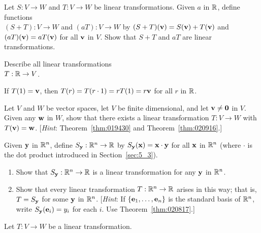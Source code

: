 \begin{multicols}{2}
\begin{ex}
Let $S : V \to W$ and $T : V \to W$ be linear transformations. Given $a$ in $\mathbb{R}$, define functions \\ $(S + T) : V \to W$ and $(aT) : V \to W$ by $(S + T)(\textbf{v}) = S(\textbf{v}) + T(\textbf{v})$ and $(aT)(\textbf{v}) = aT(\textbf{v})$ for all $\textbf{v}$ in $V$. Show that $S + T$ and $aT$ are linear transformations.
\end{ex}

\begin{ex}
Describe all linear transformations \\ $T : \mathbb{R} \to V$.

\begin{sol}
If $T(1) = \textbf{v}$, then $T(r) = T(r \cdot 1) = rT(1) = r\textbf{v}$ for all $r$ in $\mathbb{R}$.
\end{sol}
\end{ex}

\begin{ex}
Let $V$ and $W$ be vector spaces, let $V$ be finite dimensional, and let $\textbf{v} \neq \textbf{0}$ in $V$. Given any $\textbf{w}$ in $W$, show that there exists a linear transformation $T : V \to W$ with $T(\textbf{v}) = \textbf{w}$. [\textit{Hint}: Theorem~\ref{thm:019430} and Theorem~\ref{thm:020916}.]
\end{ex}

\begin{ex}
Given $\textbf{y}$ in $\mathbb{R}^n$, define $S_{\textbf{y}} : \mathbb{R}^n \to \mathbb{R}$ by $S_{\textbf{y}}(\textbf{x}) = \textbf{x} \cdot \textbf{y}$ for all $\textbf{x}$ in $\mathbb{R}^n$ (where $\cdot$ is the dot product introduced in Section~\ref{sec:5_3}).


\begin{enumerate}[label={\alph*.}]
\item Show that $S_{\textbf{y}} : \mathbb{R}^n \to \mathbb{R}$ is a linear transformation for any $\textbf{y}$ in $\mathbb{R}^n$.

\item Show that every linear transformation $T : \mathbb{R}^n \to \mathbb{R}$ arises in this way; that is, $T = S_{\textbf{y}}$ for some $\textbf{y}$ in $\mathbb{R}^n$. [\textit{Hint}: If $\{\textbf{e}_{1}, \dots, \textbf{e}_{n}\}$ is the standard basis of $\mathbb{R}^n$, write $S_{\textbf{y}}(\textbf{e}_{i}) = y_{i}$ for each $i$. Use Theorem~\ref{thm:020817}.]

\end{enumerate}
\end{ex}

\begin{ex}
Let $T : V \to W$ be a linear transformation.



\end{ex}
\end{multicols}
